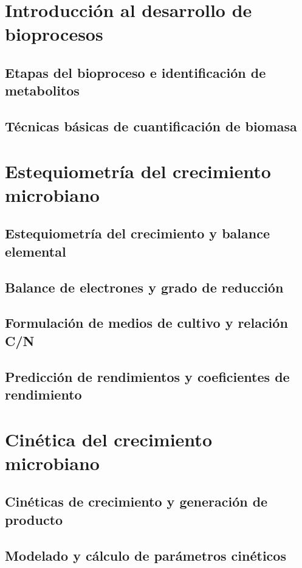 \documentclass{../summarie}
\begin{document}
\frontmatter

    \Portada 
    \tableofcontents
    \listoffigures
    \listoftables

\mainmatter

    \onehalfspacing
    \bibliographyunit[\chapter]


\part{Introducción al desarrollo de bioprocesos}

    \chapter{Etapas del bioproceso e identificación de metabolitos} 
    \chapter{Técnicas básicas de cuantificación de biomasa}

\part{Estequiometría del crecimiento microbiano}

    \chapter{Estequiometría del crecimiento y balance elemental} 
    \chapter{Balance de electrones y grado de reducción}
    \chapter{Formulación de medios de cultivo y relación C/N} 
    \chapter{Predicción de rendimientos y coeficientes de rendimiento}     

\part{Cinética del crecimiento microbiano}

    \chapter{Cinéticas de crecimiento y generación de producto} 
    \chapter{Modelado y cálculo de parámetros cinéticos}


\backmatter


\end{document}
